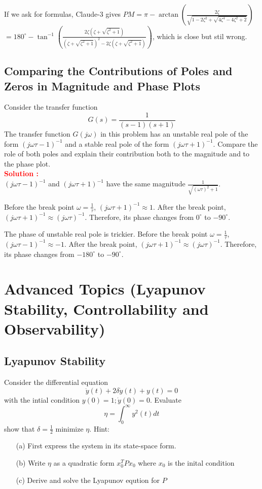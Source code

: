 \documentclass[12pt]{article}
\begin{document}
If we ask for formulas, 
Claude-3 gives $PM = \pi - \arctan\left(\frac{2\zeta}{\sqrt{1 - 2\zeta^2 + \sqrt{4\zeta^4 - 4\zeta^2 + 2}}}\right)$ $=180^\circ-\tan^{-1}\left(\frac{2 \zeta (\zeta+\sqrt{\zeta^2+1})}{(\zeta+\sqrt{\zeta^2+1})^2-2 \zeta (\zeta+\sqrt{\zeta^2+1})}\right)$, which is close but stil wrong. 
\clearpage

\subsection{Comparing the Contributions of Poles and Zeros in Magnitude and Phase Plots}

Consider the transfer function 
\[
G(s)=\frac{1}{(s - 1)(s+1)}
\]
The transfer function $G(j\omega)$ in this problem has an unstable real pole of the form $(j\omega \tau -1)^{-1}$ and a stable real pole of the form $(j\omega \tau + 1)^{-1}$. Compare the role of both poles and explain their contribution both to the magnitude and to the phase plot.\\ 
\textbf{\textcolor{red}{Solution :}} \\
$(j\omega \tau -1)^{-1}$ and $(j\omega \tau +1)^{-1}$ have the same magnitude $\frac{1}{\sqrt{(\omega \tau)^2 +1}}$.

\noindent Before the break point $\omega=\frac{1}{\tau}$, $(j\omega \tau +1)^{-1} \approx 1$. After the break point, $(j\omega \tau +1)^{-1} \approx (j\omega \tau)^{-1}$. Therefore, its phase changes from $0^\circ$ to $-90^\circ$.

\noindent The phase of unstable real pole is trickier. Before the break point $\omega=\frac{1}{\tau}$, $(j\omega \tau -1)^{-1} \approx -1$. After the break point, $(j\omega \tau +1)^{-1} \approx (j\omega \tau)^{-1}$. Therefore, its phase changes from $-180^\circ$ to $-90^\circ$.

\clearpage
\section{Advanced Topics (Lyapunov Stability, Controllability and Observability)}
\subsection{Lyapunov Stability}

Consider the differential equation
\begin{equation}
    \ddot{y}(t) + 2\delta \dot{y}(t) + y(t) = 0
\end{equation}
with the intial condition \(y(0) = 1; \dot{y}(0) = 0\). Evaluate
\begin{equation}
    \eta = \int_0^{\infty} y^2(t) dt
\end{equation}
show that \(\delta = \frac{1}{2}\) minimize \(\eta\). Hint:
\begin{enumerate}
    \item[(a)] First express the system in its state-space form.
    \item[(b)] Write \(\eta\) as a quadratic form \(x_0^TP x_0\) where \(x_0\) is the inital condition
    \item[(c)] Derive and solve the Lyapunov eqution for \(P\)
\end{enumerate}
\end{document}

